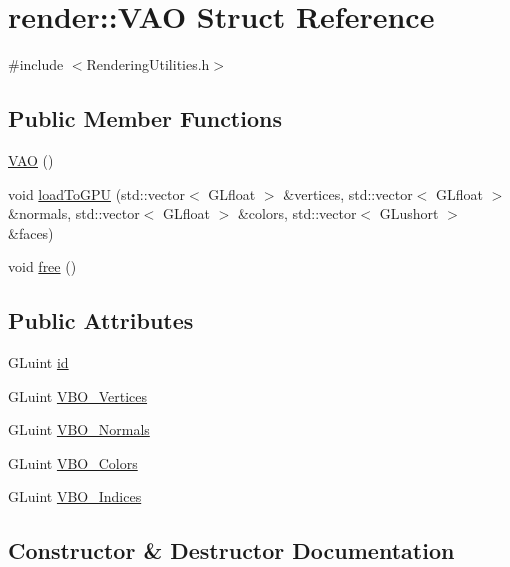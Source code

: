 \hypertarget{structrender_1_1_v_a_o}{}\section{render\+:\+:V\+AO Struct Reference}
\label{structrender_1_1_v_a_o}


{\ttfamily \#include $<$Rendering\+Utilities.\+h$>$}

\subsection*{Public Member Functions}
\begin{DoxyCompactItemize}
\item 
\hyperlink{structrender_1_1_v_a_o_a71f7f1c4689ee367a65ab7296a4421d5}{V\+AO} ()
\item 
void \hyperlink{structrender_1_1_v_a_o_a3b4d375d1bab4451be2a6978f12b451d}{load\+To\+G\+PU} (std\+::vector$<$ G\+Lfloat $>$ \&vertices, std\+::vector$<$ G\+Lfloat $>$ \&normals, std\+::vector$<$ G\+Lfloat $>$ \&colors, std\+::vector$<$ G\+Lushort $>$ \&faces)
\item 
void \hyperlink{structrender_1_1_v_a_o_a8c3c7fa9802206d08a9a0259b490356b}{free} ()
\end{DoxyCompactItemize}
\subsection*{Public Attributes}
\begin{DoxyCompactItemize}
\item 
G\+Luint \hyperlink{structrender_1_1_v_a_o_ab22eae990c3e08f3c7e7d0d01340faf8}{id}
\item 
G\+Luint \hyperlink{structrender_1_1_v_a_o_a41b864db7e017ec319c3e245d6400d65}{V\+B\+O\+\_\+\+Vertices}
\item 
G\+Luint \hyperlink{structrender_1_1_v_a_o_af066ecf4482fa82139e1e7ff90297fab}{V\+B\+O\+\_\+\+Normals}
\item 
G\+Luint \hyperlink{structrender_1_1_v_a_o_a09b3b357d379838743c2035d30398a4f}{V\+B\+O\+\_\+\+Colors}
\item 
G\+Luint \hyperlink{structrender_1_1_v_a_o_a6bdf2b235f4fd292dcc96663c105d397}{V\+B\+O\+\_\+\+Indices}
\end{DoxyCompactItemize}


\subsection{Constructor \& Destructor Documentation}
